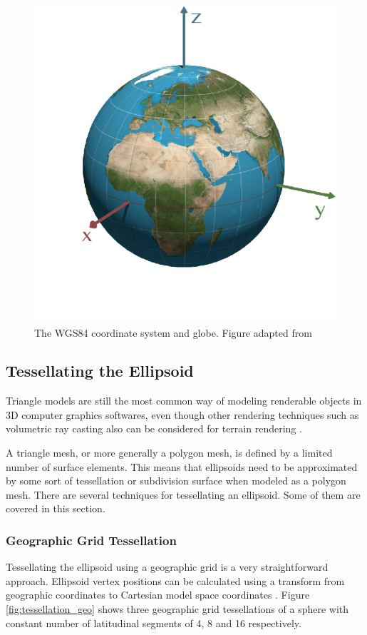 \begin{figure}
\centering
\includegraphics[scale=0.25]{figures/wgs84.jpg}
\caption{The WGS84 coordinate system and globe. Figure adapted from \cite{mapprojections}}
\label{fig:wgs84}
\end{figure}

\subsection{Tessellating the Ellipsoid}

Triangle models are still the most common way of modeling renderable objects in 3D computer graphics softwares, even though other rendering techniques such as volumetric ray casting also can be considered for terrain rendering \cite[p. 149]{cozzi11}.

A triangle mesh, or more generally a polygon mesh, is defined by a limited number of surface elements. This means that ellipsoids need to be approximated by some sort of tessellation or subdivision surface when modeled as a polygon mesh. There are several techniques for tessellating an ellipsoid. Some of them are covered in this section.

\subsubsection{Geographic Grid Tessellation}
\label{sec:geogrid}
Tessellating the ellipsoid using a geographic grid is a very straightforward approach. Ellipsoid vertex positions can be calculated using a transform from geographic coordinates to Cartesian model space coordinates \cite[p. 25]{cozzi11}. Figure \ref{fig:tessellation_geo} shows three geographic grid tessellations of a sphere with constant number of latitudinal segments of 4, 8 and 16 respectively.

